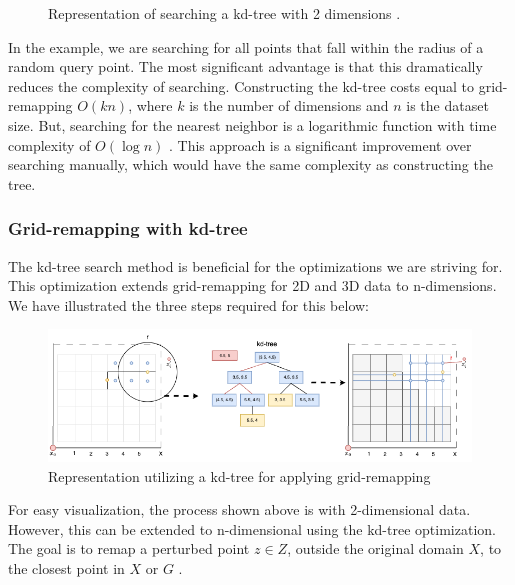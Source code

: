 {\begin{figure}[H]
  \caption{Representation of searching a kd-tree with 2 dimensions \citep{washington_k-d_2002}.}
  \label{fig:kd-tree-searching-theory}
\end{figure}
In the example, we are searching for all points that fall within the radius of a random query point.
The most significant advantage is that this dramatically reduces the complexity of searching.
Constructing the kd-tree costs equal to grid-remapping $O(kn)$, where $k$ is the number of dimensions and $n$ is the dataset size.
But, searching for the nearest neighbor is a logarithmic function with time complexity of $O(\log n)$ \citep{washington_k-d_2002}.
This approach is a significant improvement over searching manually, which would have the same complexity as constructing the tree.

\subsubsection{Grid-remapping with kd-tree} \label{theory:grid-remapping}
The kd-tree search method is beneficial for the optimizations we are striving for.
This optimization extends grid-remapping for 2D \citep{DBLP:journals/corr/abs-1212-1984} and 3D data \citep{9646489} to n-dimensions. \newline
We have illustrated the three steps required for this below:
\begin{figure}[H]
  \includegraphics[width=1\textwidth]{TheorethicalFramework/ND-Laplace/Images/KD-tree.png}
  \caption{Representation utilizing a kd-tree for applying grid-remapping \citep{DBLP:journals/corr/abs-1212-1984}}
  \label{fig:kd-tree}
\end{figure}
For easy visualization, the process shown above is with 2-dimensional data.
However, this can be extended to n-dimensional using the kd-tree optimization.
The goal is to remap a perturbed point $z \in Z$, outside the original domain $X$, to the closest point in $X$ or $G$ \citep{DBLP:journals/corr/abs-1212-1984}.

}
